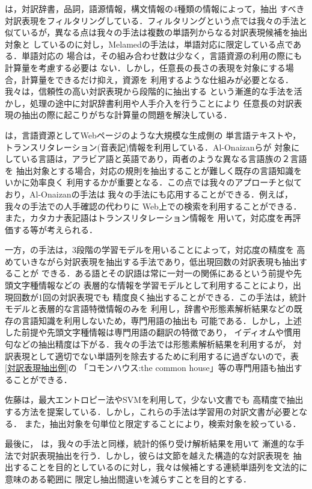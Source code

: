 \cite{Melamed:1995} は，対訳辞書，品詞，語源情報，構文情報の4種類の情報によって，抽出
すべき対訳表現をフィルタリングしている．フィルタリングという点では我々の手法と
似ているが，異なる点は我々の手法は複数の単語列からなる対訳表現候補を抽出対象と
しているのに対し，Melamedの手法は，単語対応に限定している点である．単語対応の
場合は，その組み合わせ数は少なく，言語資源の利用の際にも計算量を考慮する必要は
ない．しかし，任意長の長さの表現を対象にする場合，計算量をできるだけ抑え，資源を
利用するような仕組みが必要となる．我々は，信頼性の高い対訳表現から段階的に抽出する
という漸進的な手法を活かし，処理の途中に対訳辞書利用や人手介入を行うことにより
任意長の対訳表現の抽出の際に起こりがちな計算量の問題を解決している．

\cite{Al-Onaizan-Kevin:2002}は，言語資源としてWebページのような大規模な生成側の
単言語テキストや，トランスリタレーション(音表記)情報を利用している．Al-Onaizanらが
対象にしている言語は，アラビア語と英語であり，両者のような異なる言語族の２言語を
抽出対象とする場合，対応の規則を抽出することが難しく既存の言語知識をいかに効率良く
利用するかが重要となる．この点では我々のアプローチと似ており，Al-Onaizanの手法は
我々の手法にも応用することができる．例えば，我々の手法での人手確認の代わりに
Web上での検索を利用することができる．また，カタカナ表記語はトランスリタレーション情報を
用いて，対応度を再評価する等が考えられる．

一方，\cite{Moore:2003}の手法は，3段階の学習モデルを用いることによって，対応度の精度を
高めていきながら対訳表現を抽出する手法であり，低出現回数の対訳表現も抽出することが
できる．ある語とその訳語は常に一対一の関係にあるという前提や先頭文字種情報などの
表層的な情報を学習モデルとして利用することにより，出現回数が1回の対訳表現でも
精度良く抽出することができる．この手法は，統計モデルと表層的な言語特徴情報のみを
利用し，辞書や形態素解析結果などの既存の言語知識を利用しないため，専門用語の抽出も
可能である．しかし，上述した前提や先頭文字種情報は専門用語の翻訳の特徴であり，
イディオムや慣用句などの抽出精度は下がる．我々の手法では形態素解析結果を利用するが，
対訳表現として適切でない単語列を除去するために利用するに過ぎないので，表\ref{対訳表現抽出例}の
「コモンハウス:the common house」等の専門用語も抽出することができる．

佐藤は，最大エントロピー法\cite{佐藤2002}やSVM\cite{佐藤2003}を利用して，少ない文書でも
高精度で抽出する方法を提案している．しかし，これらの手法は学習用の対訳文書が必要となる．
また，抽出対象を句単位と限定することにより，検索対象を絞っている．

最後に， \cite{山本2001}は，我々の手法と同様，統計的係り受け解析結果を用いて
漸進的な手法で対訳表現抽出を行う．しかし，彼らは文節を越えた構造的な対訳表現を
抽出することを目的としているのに対し，我々は候補とする連続単語列を文法的に意味のある範囲に
限定し抽出間違いを減らすことを目的とする．

